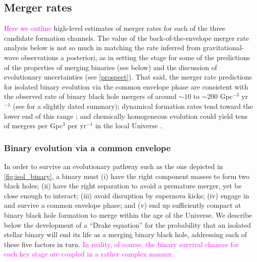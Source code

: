 \documentclass[iop,onecolumn]{revtex4}
\newcommand{\ilya}[1]{\textcolor{magenta}{#1}}
\begin{document}
\subsection{Merger rates}

\ilya{Here we outline} high-level estimates of merger rates for each of the three candidate formation channels. The value of the back-of-the-envelope merger rate analysis below is not so much in matching the rate inferred from gravitational-wave observations a posteriori, as in setting the stage for some of the predictions of the properties of merging binaries (see below) and the discussion of evolutionary uncertainties (see \autoref{prospect}).  That said, the merger rate predictions for isolated binary evolution via the common envelope phase are consistent with the observed rate of binary black hole mergers of around $\sim 10$ to $\sim 200$ Gpc$^{-3}$ yr$^{-1}$ \citep{GW150914:rates,GW170104} (see \citet{ratesdoc} for a slightly dated summary); dynamical formation rates tend toward the lower end of this range \citep{Rodriguez:2016,Park:2017,FragioneKocsis:2018}; and chemically homogeneous evolution could yield tens of mergers per Gpc$^{3}$ per yr$^{-1}$ in the local Universe \citep{MandeldeMink:2016,Marchant:2016}.

\subsubsection{Binary evolution via a common envelope}\label{sec:CErates}

In order to survive an evolutionary pathway such as the one depicted in \autoref{fig:isol_binary}, a binary must (i) have the right component masses to form two black holes; (ii) have the right separation to avoid a premature merger, yet be close enough to interact; (iii) avoid disruption by supernova kicks; (iv) engage in and survive a common envelope phase; and (v) end up sufficiently compact at binary black hole formation to merge within the age of the Universe. We describe below the development of a ``Drake equation'' for the probability that an isolated stellar binary will end its life as a merging binary black hole, addressing each of these five factors in turn.   \ilya{In reality, of course, the binary survival chances for each key stage are coupled in a rather complex manner.}
\end{document}
